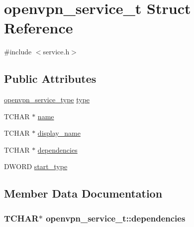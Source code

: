 \hypertarget{structopenvpn__service__t}{}\section{openvpn\+\_\+service\+\_\+t Struct Reference}
\label{structopenvpn__service__t}


{\ttfamily \#include $<$service.\+h$>$}

\subsection*{Public Attributes}
\begin{DoxyCompactItemize}
\item 
\hyperlink{service_8h_aef1837f9e79431d8295c9ef230dfcb71}{openvpn\+\_\+service\+\_\+type} \hyperlink{structopenvpn__service__t_acb7dfd50530ccaa9e9b2d8adc187c851}{type}
\item 
T\+C\+H\+A\+R $\ast$ \hyperlink{structopenvpn__service__t_a8656948a912ca64eb085a7f04044250c}{name}
\item 
T\+C\+H\+A\+R $\ast$ \hyperlink{structopenvpn__service__t_a3698084bf69f74c972583de6e7aebb18}{display\+\_\+name}
\item 
T\+C\+H\+A\+R $\ast$ \hyperlink{structopenvpn__service__t_ad46c92f8d0c47803cb60cf7d4606de14}{dependencies}
\item 
D\+W\+O\+R\+D \hyperlink{structopenvpn__service__t_a3a1e4c37c8390d3607f7052474be0d1e}{start\+\_\+type}
\end{DoxyCompactItemize}


\subsection{Member Data Documentation}
\hypertarget{structopenvpn__service__t_ad46c92f8d0c47803cb60cf7d4606de14}{}
\subsubsection[{dependencies}]{\setlength{\rightskip}{0pt plus 5cm}T\+C\+H\+A\+R$\ast$ openvpn\+\_\+service\+\_\+t\+::dependencies}\label{structopenvpn__service__t_ad46c92f8d0c47803cb60cf7d4606de14}
\hypertarget{structopenvpn__service__t_a3698084bf69f74c972583de6e7aebb18}{}
